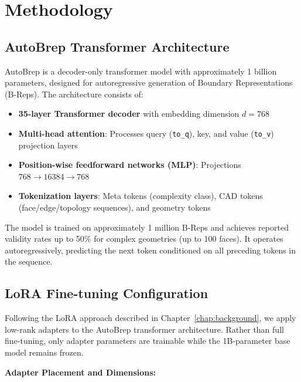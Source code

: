 \section{Methodology}
\label{chap:methodology}

\subsection{AutoBrep Transformer Architecture}

AutoBrep is a decoder-only transformer model with approximately 1 billion parameters, designed for autoregressive generation of Boundary Representations (B-Reps). The architecture consists of:

\begin{itemize}
	\item \textbf{35-layer Transformer decoder} with embedding dimension $d = 768$
	\item \textbf{Multi-head attention}: Processes query (\texttt{to\_q}), key, and value (\texttt{to\_v}) projection layers
	\item \textbf{Position-wise feedforward networks (MLP)}: Projections $768 \to 16384 \to 768$
	\item \textbf{Tokenization layers}: Meta tokens (complexity class), CAD tokens (face/edge/topology sequences), and geometry tokens
\end{itemize}

The model is trained on approximately 1 million B-Reps and achieves reported validity rates up to 50\% for complex geometries (up to 100 faces). It operates autoregressively, predicting the next token conditioned on all preceding tokens in the sequence.

\subsection{LoRA Fine-tuning Configuration}

Following the LoRA approach described in Chapter~\ref{chap:background}, we apply low-rank adapters to the AutoBrep transformer architecture. Rather than full fine-tuning, only adapter parameters are trainable while the 1B-parameter base model remains frozen.

\textbf{Adapter Placement and Dimensions:}


